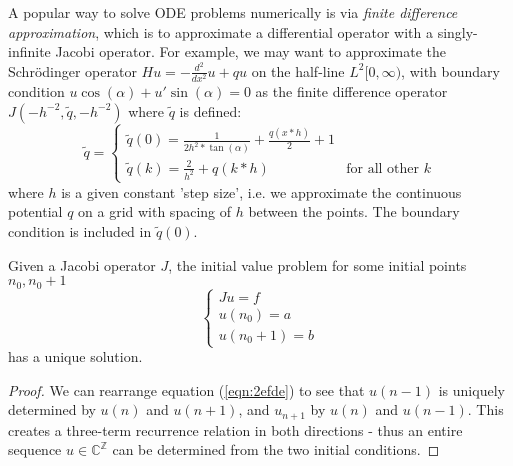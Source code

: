 \documentclass[../main.tex]{subfiles}
\begin{document}
\begin{example}
\label{ex:finite-differences}
  A popular way to solve ODE problems numerically is via \emph{finite difference approximation},
  which is to approximate a differential operator with a singly-infinite Jacobi operator. For
  example, we may want to approximate the Schr\"odinger operator $Hu = -\frac{d^2}{dx^2}u + qu$
  on the half-line $L^2[0, \infty)$, with boundary condition $u \cos(\alpha) + u' \sin(\alpha) = 0$
  as the finite difference operator
  $J(-h^{-2}, \tilde{q}, -h^{-2})$
  where $\tilde{q}$ is defined:
  $$
  \tilde{q} =
  \begin{cases}
    \tilde{q}(0) = \frac{1}{2h^2 * \tan(\alpha)} + \frac{q(x*h)}{2} + 1 \\
    \tilde{q}(k) = \frac{2}{h^2} + q(k*h) & \text{for all other $k$}
  \end{cases}
  $$
  where $h$ is a given constant 'step size', i.e. we approximate the continuous
  potential $q$ on a grid with spacing of $h$ between the points. The boundary
  condition is included in $\tilde{q}(0)$.
\end{example}

\begin{proposition}\label{thm:2efde-sols} 
  Given a Jacobi operator $J$, the initial value problem for some initial points
  $n_0, n_0 + 1$
  $$
  \begin{cases}
    Ju = f\\
    u(n_0) = a\\ u(n_0 + 1) = b
  \end{cases} 
  $$
  has a unique solution.
\end{proposition}
\begin{proof}
We can rearrange equation (\ref{eqn:2efde}) to see that $u(n-1)$ is uniquely
determined by $u(n)$ and $u(n+1)$, and $u_{n+1}$ by $u(n)$ and
$u(n-1)$. This creates a three-term recurrence relation in both directions -
thus an entire sequence $u \in \mathbb{C}^\mathbb{Z}$ can be determined from the two
initial conditions.
\end{proof}
\end{document}
